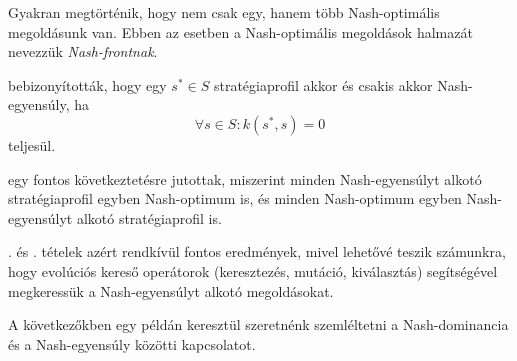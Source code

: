 \begin{ert}
  Gyakran megtörténik, hogy nem csak egy, hanem több Nash-optimális megoldásunk van.
  Ebben az esetben a Nash-optimális megoldások halmazát nevezzük \emph{Nash-frontnak}.
\end{ert}


\begin{tet}\label{thm:PROFIL_NE_DOMINANCIAVAL}
   bebizonyították, hogy egy $s^* \in S$ stratégiaprofil akkor és csakis akkor Nash-egyensúly, ha
  \[
    \forall s \in S \colon k(s^*, s) = 0
  \]
  teljesül.
\end{tet}

\begin{tet}\label{thm:NE_EGYENLO_NF}
   egy fontos következtetésre jutottak, miszerint minden Nash-egyensúlyt alkotó stratégiaprofil egyben Nash-optimum is, és minden Nash-optimum egyben Nash-egyensúlyt alkotó stratégiaprofil is.
\end{tet}

\begin{meg}
  . és . tételek azért rendkívül fontos eredmények, mivel lehetővé teszik számunkra, hogy evolúciós kereső operátorok (keresztezés, mutáció, kiválasztás) segítségével megkeressük a Nash-egyensúlyt alkotó megoldásokat.
\end{meg}


A következőkben egy példán keresztül szeretnénk szemléltetni a Nash-dominancia és a Nash-egyensúly közötti kapcsolatot.

